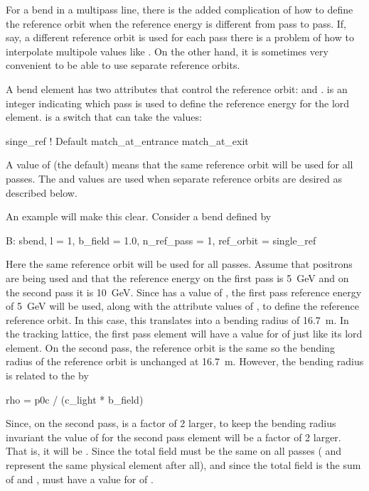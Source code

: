 For a bend in a multipass line, there is the added complication of how
to define the reference orbit when the reference energy is different
from pass to pass. If, say, a different reference orbit is used for
each pass there is a problem of how to interpolate multipole values
like . On the other hand, it is sometimes very convenient to be
able to use separate reference orbits. 

A bend element has two attributes that control the reference orbit:
 and .  is an
integer indicating which pass is used to define the reference energy
for the lord element.  is a switch that can take
the values:
\begin{example}
  singe_ref            ! Default
  match_at_entrance
  match_at_exit
\end{example}
A value of  (the default) means that the same reference
orbit will be used for all passes. The  and
 values are used when separate reference orbits are
desired as described below.

An example will make this clear. Consider a bend defined by
\begin{example} 
  B: sbend, l = 1, b_field = 1.0, n_ref_pass = 1, ref_orbit = single_ref
\end{example}
Here the same reference orbit will be used for all passes.  Assume
that positrons are being used and that the reference energy on the
first pass is 5~GeV and on the second pass it is 10~GeV. Since
 has a value of , the first pass reference energy
of 5~GeV will be used, along with the attribute values of , to
define the reference reference orbit. In this case, this translates
into a bending radius  of 16.7~m.  In the tracking lattice,
the first pass element  will have a value for  of
 just like its lord element. On the second pass, the reference
orbit is the same so the bending radius of the reference orbit 
is unchanged at 16.7~m. However, the bending radius is
related to the  by
\begin{example}
  rho = p0c / (c_light * b_field)
\end{example}
Since, on the second pass,  is a factor of 2 larger, to keep
the bending radius invariant the value of  for the second
pass element  will be a factor of 2 larger. That is, it will
be . Since the total field must be the same on all passes
( and  represent the same physical element after
all), and since the total field is the sum of  and
,  must have a value for  of
.

